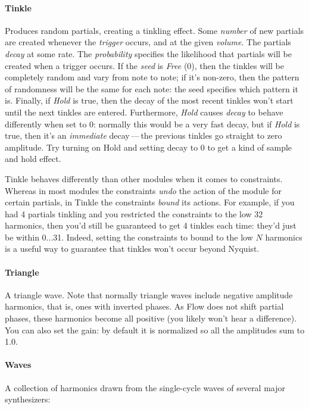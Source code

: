 \documentclass{article}
\newcommand\name{Flow}
\begin{document}
\paragraph{Tinkle}  Produces random partials, creating a tinkling effect.  Some {\it number} of new partials are created whenever the {\it trigger} occurs, and at the given {\it volume}.  The partials {\it decay} at some rate.  The {\it probability} specifies the likelihood that partials will be created when a trigger occurs.   If the {\it seed} is {\it Free} (0), then the tinkles will be completely random and vary from note to note; if it's non-zero, then the pattern of randomness will be the same for each note: the seed specifies which pattern it is.  Finally, if {\it Hold} is true, then the decay of the most recent tinkles won't start until the next tinkles are entered.  Furthermore, {\it Hold} causes {\it decay} to behave differently when set to 0: normally this would be a very fast decay, but if {\it Hold} is true, then it's an {\it immediate} decay\,---\,the previous tinkles go straight to zero amplitude.  Try turning on Hold and setting decay to 0 to get a kind of sample and hold effect.

Tinkle behaves differently than other modules when it comes to constraints.  Whereas in most modules the constraints {\it undo} the action of the module for certain partials, in Tinkle the constraints {\it bound} its actions.  For example, if you had 4 partials tinkling and you restricted the constraints to the low 32 harmonics, then you'd still be guaranteed to get 4 tinkles each time: they'd just be within 0...31.  Indeed, setting the constraints to bound to the low \(N\) harmonics is a useful way to guarantee that tinkles won't occur beyond Nyquist.

\paragraph{Triangle}  A triangle wave.  Note that normally triangle waves include negative amplitude harmonics, that is, ones with inverted phases.  As {\name} does not shift partial phases, these harmonics become all positive (you likely won't hear a difference).  You can also set the gain: by default it is normalized so all the amplitudes sum to 1.0.

\paragraph{Waves}  A collection of harmonics drawn from the single-cycle waves of several major synthesizers:
\end{document}
